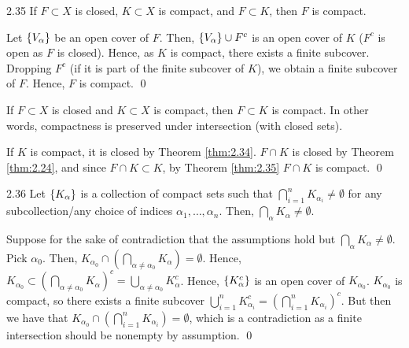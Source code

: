 \begin{theorem}{}{2.35}
    If $F \subset X$ is closed, $K \subset X$ is compact, and $F \subset K$, then $F$ is compact.
\end{theorem}

\begin{nproof}
    Let $\set{V_\alpha}$ be an open cover of $F$. Then, $\set{V_\alpha} \cup F^c$ is an open cover of $K$ ($F^c$ is open as $F$ is closed). Hence, as $K$ is compact, there exists a finite subcover. Dropping $F^c$ (if it is part of the finite subcover of $K$), we obtain a finite subcover of $F$. Hence, $F$ is compact. \qed
\end{nproof}

\begin{ncorollary}{}{}
    If $F \subset X$ is closed and $K \subset X$ is compact, then $F \subset K$ is compact. In other words, compactness is preserved under intersection (with closed sets).
\end{ncorollary}

\begin{nproof}
    If $K$ is compact, it is closed by Theorem \ref{thm:2.34}. $F \cap K$ is closed by Theorem \ref{thm:2.24}, and since $F \cap K \subset K$, by Theorem \ref{thm:2.35} $F \cap K$ is compact. \qed
\end{nproof}

\begin{theorem}{}{2.36}
    Let $\set{K_\alpha}$ is a collection of compact sets such that $\bigcap_{i=1}^n K_{\alpha_{i}} \neq \emptyset$ for any subcollection/any choice of indices $\alpha_1, \ldots, \alpha_n$. Then, $\bigcap_\alpha K_\alpha \neq \emptyset$.
\end{theorem}
\begin{nproof}
    Suppose for the sake of contradiction that the assumptions hold but $\bigcap_\alpha K_\alpha \neq \emptyset$. Pick $\alpha_0$. Then, $K_{\alpha_0} \cap (\bigcap_{\alpha \neq \alpha_0} K_\alpha) = \emptyset$. Hence, $K_{\alpha_0} \subset \left(\bigcap_{\alpha \neq \alpha_0} K_\alpha \right)^c = \bigcup_{\alpha \neq \alpha_0} K_\alpha^c$. Hence, $\set{K_\alpha^c}$ is an open cover of $K_{\alpha_0}$. $K_{\alpha_0}$ is compact, so there exists a finite subcover $\bigcup_{i=1}^n K_{\alpha_i}^c = \left(\bigcap_{i=1}^n K_{\alpha_i}\right)^c$. But then we have that $K_{\alpha_0} \cap \left(\bigcap_{i=1}^n K_{\alpha_i}\right) = \emptyset$, which is a contradiction as a finite intersection should be nonempty by assumption. \qed
\end{nproof}

